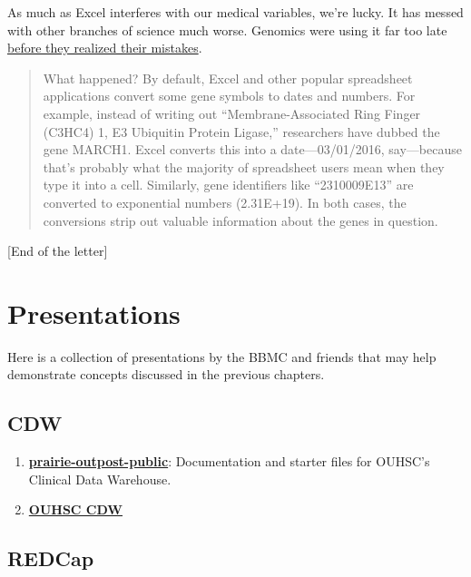 \documentclass[
]{book}
\providecommand{\tightlist}{%
  \setlength{\itemsep}{0pt}\setlength{\parskip}{0pt}}
\begin{document}
As much as Excel interferes with our medical variables, we're lucky. It has messed with other branches of science much worse. Genomics were using it far too late \href{https://qz.com/768334/years-of-genomics-research-is-riddled-with-errors-thanks-to-a-bunch-of-botched-excel-spreadsheets/}{before they realized their mistakes}.

\begin{quote}
What happened? By default, Excel and other popular spreadsheet applications convert some gene symbols to dates and numbers. For example, instead of writing out ``Membrane-Associated Ring Finger (C3HC4) 1, E3 Ubiquitin Protein Ligase,'' researchers have dubbed the gene MARCH1. Excel converts this into a date---03/01/2016, say---because that's probably what the majority of spreadsheet users mean when they type it into a cell. Similarly, gene identifiers like ``2310009E13'' are converted to exponential numbers (2.31E+19). In both cases, the conversions strip out valuable information about the genes in question.
\end{quote}

{[}End of the letter{]}

\hypertarget{presentations}{%
\chapter{Presentations}\label{presentations}}

Here is a collection of presentations by the BBMC and friends that may help demonstrate concepts discussed in the previous chapters.

\hypertarget{cdw}{%
\section{CDW}\label{cdw}}

\begin{enumerate}
\def\labelenumi{\arabic{enumi}.}
\tightlist
\item
  \textbf{\href{https://github.com/OuhscBbmc/prairie-outpost-public}{prairie-outpost-public}}: Documentation and starter files for OUHSC's Clinical Data Warehouse.
\item
  \textbf{\href{https://github.com/OuhscBbmc/BbmcResources/blob/master/Publications/presentation-2015-11-18-cdw-bse/clinical-data-warehouse-bse.pdf}{OUHSC CDW}}
\end{enumerate}

\hypertarget{redcap}{%
\section{REDCap}\label{redcap}}
\end{document}
